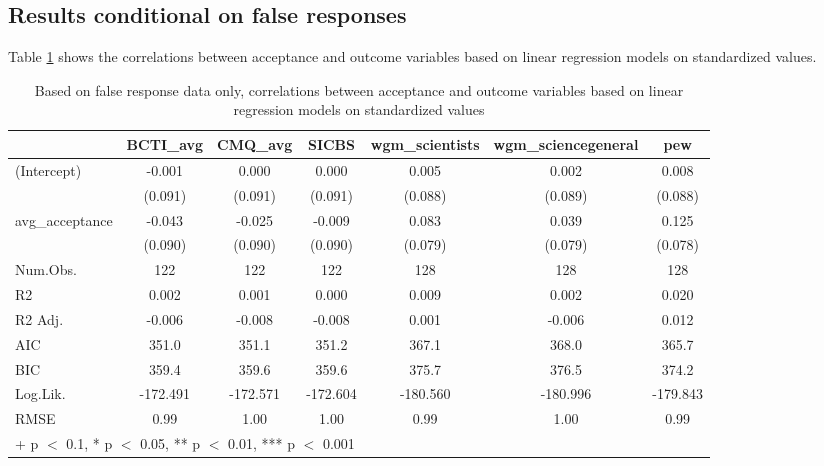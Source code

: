\documentclass[
  doc,floatsintext]{apa6}
\begin{document}
\subsection{Results conditional on false responses}\label{results-conditional-on-false-responses-2}

Table \ref{tab:exp3-false-response-regression} shows the correlations between acceptance and outcome variables based on linear regression models on standardized values.

\begin{table}

\caption{\label{tab:exp3-false-response-regression}Based on false response data only, correlations between acceptance and outcome variables based on linear regression models on standardized values}
\centering
\begin{tabular}[t]{lcccccc}
\toprule
  & BCTI\_avg & CMQ\_avg & SICBS & wgm\_scientists & wgm\_sciencegeneral & pew\\
\midrule
(Intercept) & -0.001 & 0.000 & 0.000 & 0.005 & 0.002 & 0.008\\
 & (0.091) & (0.091) & (0.091) & (0.088) & (0.089) & (0.088)\\
avg\_acceptance & -0.043 & -0.025 & -0.009 & 0.083 & 0.039 & 0.125\\
 & (0.090) & (0.090) & (0.090) & (0.079) & (0.079) & (0.078)\\
\midrule
Num.Obs. & 122 & 122 & 122 & 128 & 128 & 128\\
R2 & 0.002 & 0.001 & 0.000 & 0.009 & 0.002 & 0.020\\
R2 Adj. & -0.006 & -0.008 & -0.008 & 0.001 & -0.006 & 0.012\\
AIC & 351.0 & 351.1 & 351.2 & 367.1 & 368.0 & 365.7\\
BIC & 359.4 & 359.6 & 359.6 & 375.7 & 376.5 & 374.2\\
Log.Lik. & -172.491 & -172.571 & -172.604 & -180.560 & -180.996 & -179.843\\
RMSE & 0.99 & 1.00 & 1.00 & 0.99 & 1.00 & 0.99\\
\bottomrule
\multicolumn{7}{l}{\rule{0pt}{1em}+ p $<$ 0.1, * p $<$ 0.05, ** p $<$ 0.01, *** p $<$ 0.001}\\
\end{tabular}
\end{table}
\end{document}
